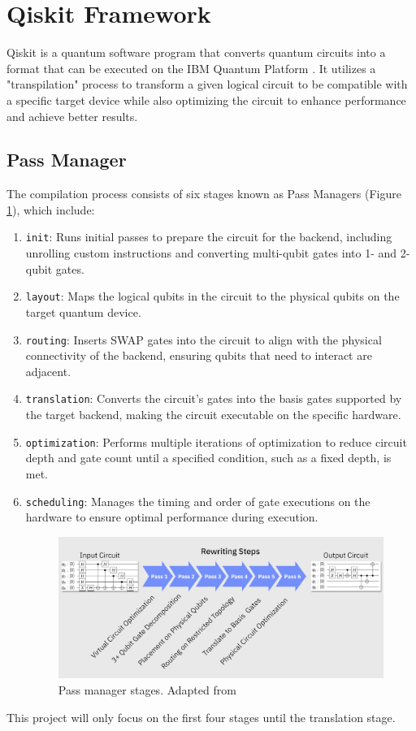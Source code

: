 \section{Qiskit Framework}
Qiskit is a quantum software program that converts quantum circuits into a format that can be executed on the IBM Quantum Platform \cite{ibmquantum_computeresources}. It utilizes a "transpilation" process to transform a given logical circuit to be compatible with a specific target device while also optimizing the circuit to enhance performance and achieve better results.

\subsection{Pass Manager}
The compilation process consists of six stages known as Pass Managers \cite{ibmquantum_transpiler} (Figure \ref{fig:transpiler}), which include:
\begin{enumerate}[nolistsep]
    \item \lstinline{init}: Runs initial passes to prepare the circuit for the backend, including unrolling custom instructions and converting multi-qubit gates into 1- and 2-qubit gates.
    \item \lstinline{layout}: Maps the logical qubits in the circuit to the physical qubits on the target quantum device.
    \item \lstinline{routing}: Inserts SWAP gates into the circuit to align with the physical connectivity of the backend, ensuring qubits that need to interact are adjacent.
    \item \lstinline{translation}: Converts the circuit's gates into the basis gates supported by the target backend, making the circuit executable on the specific hardware.
    \item \lstinline{optimization}: Performs multiple iterations of optimization to reduce circuit depth and gate count until a specified condition, such as a fixed depth, is met.
    \item \lstinline{scheduling}: Manages the timing and order of gate executions on the hardware to ensure optimal performance during execution.
    \begin{figure}[h]
        \centering
        \includegraphics[width=0.75\linewidth]{image/transpiling_core_steps.png}
        \caption[Pass manager stages]{Pass manager stages. Adapted from \cite{ibmquantum_transpiler}}
        \label{fig:transpiler}
    \end{figure}
\end{enumerate}
This project will only focus on the first four stages until the translation stage.

